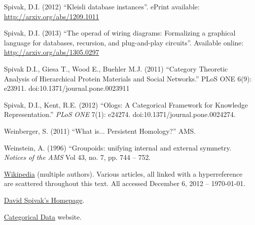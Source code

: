 \documentclass[a4paper]{book}
\theoremstyle{myth}
\begin{document}
\begin{russian}
\begin{thebibliography}{SGWB}
 Spivak, D.I. (2012) “Kleisli database instances”. ePrint available: \url{http://arxiv.org/abs/1209.1011}

 Spivak, D.I. (2013) “The operad of wiring diagrams: Formalizing a graphical language for databases, recursion, and plug-and-play circuits”. Available online: \url{http://arxiv.org/abs/1305.0297}

 Spivak D.I., Giesa T., Wood E., Buehler M.J. (2011) “Category Theoretic Analysis of Hierarchical Protein Materials and Social Networks.” PLoS ONE 6(9): e23911. doi:10.1371/journal.pone.0023911

 Spivak, D.I., Kent, R.E. (2012) “Ologs: A Categorical Framework for Knowledge Representation.” {\em PLoS ONE} 7(1): e24274. doi:10.1371/journal.pone.0024274.

 Weinberger, S. (2011) “What is... Persistent Homology?” AMS.

 Weinstein, A. (1996) “Groupoids: unifying internal and external symmetry. {\em Notices of the AMS} Vol 43, no. 7, pp. 744 -- 752.

 \href{http://www.wikipedia.org}{\text Wikipedia} (multiple authors). Various articles, all linked with a hyperreference are scattered throughout this text. All accessed December 6, 2012 -- \today.

 \href{http://math.mit.edu/~dspivak/}{\text David Spivak's Homepage}.

 \href{http://categoricaldata.net/}{\text Categorical Data} website.

\end{thebibliography}
\end{russian}
\end{document}
